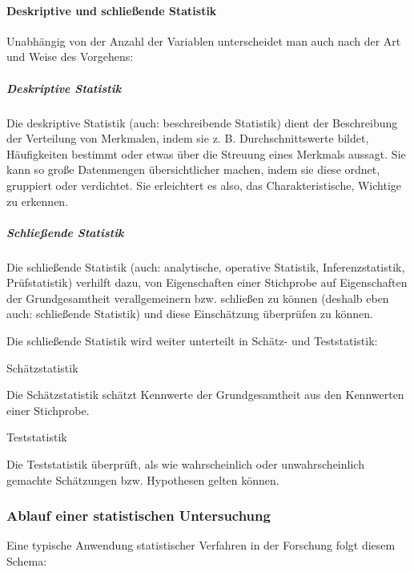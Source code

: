 \documentclass[
  ngerman,
]{article}
\begin{document}
\hypertarget{deskriptive-und-schlieuxdfende-statistik}{%
\paragraph{Deskriptive und schließende Statistik}\label{deskriptive-und-schlieuxdfende-statistik}}

Unabhängig von der Anzahl der Variablen unterscheidet man auch nach der Art und Weise des Vorgehens:

\hypertarget{deskriptive-statistik}{%
\subparagraph{Deskriptive Statistik}\label{deskriptive-statistik}}

Die deskriptive Statistik (auch: beschreibende Statistik) dient der Beschreibung der Verteilung von Merkmalen, indem sie z. B. Durchschnittswerte bildet, Häufigkeiten bestimmt oder etwas über die Streuung eines Merkmals aussagt. Sie kann so große Datenmengen übersichtlicher machen, indem sie diese ordnet, gruppiert oder verdichtet. Sie erleichtert es also, das Charakteristische, Wichtige zu erkennen.

\hypertarget{schlieuxdfende-statistik}{%
\subparagraph{Schließende Statistik}\label{schlieuxdfende-statistik}}

Die schließende Statistik (auch: analytische, operative Statistik, Inferenzstatistik, Prüfstatistik) verhilft dazu, von Eigenschaften einer Stichprobe auf Eigenschaften der Grundgesamtheit verallgemeinern bzw. schließen zu können (deshalb eben auch: schließende Statistik) und diese Einschätzung überprüfen zu können.

Die schließende Statistik wird weiter unterteilt in Schätz- und Teststatistik:

Schätzstatistik

Die Schätzstatistik schätzt Kennwerte der Grundgesamtheit aus den Kennwerten einer Stichprobe.

Teststatistik

Die Teststatistik überprüft, als wie wahrscheinlich oder unwahrscheinlich gemachte Schätzungen bzw. Hypothesen gelten können.

\hypertarget{ablauf-einer-statistischen-untersuchung}{%
\subsubsection{Ablauf einer statistischen Untersuchung}\label{ablauf-einer-statistischen-untersuchung}}

Eine typische Anwendung statistischer Verfahren in der Forschung folgt diesem Schema:
\end{document}
